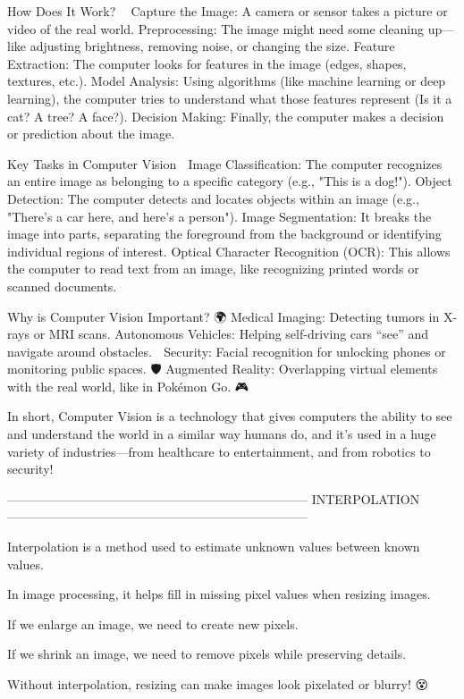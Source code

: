 How Does It Work? 🧠💡
Capture the Image: A camera or sensor takes a picture or video of the real world.
Preprocessing: The image might need some cleaning up—like adjusting brightness, removing noise, or changing the size.
Feature Extraction: The computer looks for features in the image (edges, shapes, textures, etc.).
Model Analysis: Using algorithms (like machine learning or deep learning), the computer tries to understand what those features represent (Is it a cat? A tree? A face?).
Decision Making: Finally, the computer makes a decision or prediction about the image.

Key Tasks in Computer Vision 🌟
Image Classification: The computer recognizes an entire image as belonging to a specific category (e.g., "This is a dog!").
Object Detection: The computer detects and locates objects within an image (e.g., "There’s a car here, and here’s a person").
Image Segmentation: It breaks the image into parts, separating the foreground from the background or identifying individual regions of interest.
Optical Character Recognition (OCR): This allows the computer to read text from an image, like recognizing printed words or scanned documents. 📜

Why is Computer Vision Important? 🌍
Medical Imaging: Detecting tumors in X-rays or MRI scans.
Autonomous Vehicles: Helping self-driving cars “see” and navigate around obstacles. 🚗
Security: Facial recognition for unlocking phones or monitoring public spaces. 🛡️
Augmented Reality: Overlapping virtual elements with the real world, like in Pokémon Go. 🎮

In short, Computer Vision is a technology that gives computers the ability to see and understand the world in a similar way humans do, and it's used in a huge variety of industries—from healthcare to entertainment, and from robotics to security! 🌟

------------------------------------------------------------------------
INTERPOLATION 🤔
------------------------------------------------------------------------

Interpolation is a method used to estimate unknown values between known values.

In image processing, it helps fill in missing pixel values when resizing images.

If we enlarge an image, we need to create new pixels.

If we shrink an image, we need to remove pixels while preserving details.

Without interpolation, resizing can make images look pixelated or blurry! 😵

